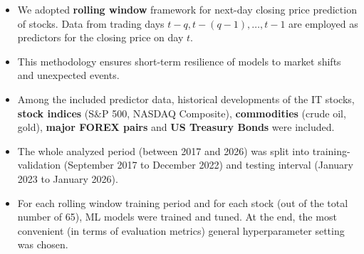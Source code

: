 \documentclass[
portrait,
a0paper%
]
{baposter}
\begin{document}
\begin{poster}
{  \begin{itemize}[noitemsep,topsep=0pt,parsep=0pt,partopsep=0pt, leftmargin=10pt]
    \item We adopted \textbf{rolling window} framework for next-day closing price prediction of stocks. Data from trading days $t-q, t-(q-1), \ldots, t-1$ are employed as predictors for the closing price on day $t$. 
    \item This methodology ensures short-term resilience of models to market shifts and unexpected events. 
    \\
    \item Among the included predictor data, historical developments of the IT stocks, \textbf{stock indices} (S\&P 500, NASDAQ Composite), \textbf{commodities} (crude oil, gold), \textbf{major FOREX pairs} and \textbf{US Treasury Bonds} were included.
    \item The whole analyzed period (between 2017 and 2026) was split into training-validation (September 2017 to December 2022) and testing interval (January 2023 to January 2026).
    \item For each rolling window training period and for each stock (out of the total number of 65), ML models were trained and tuned. At the end, the most convenient (in terms of evaluation metrics) general hyperparameter setting was chosen.

  \end{itemize}
}
%
%
\end{poster}
\end{document}

